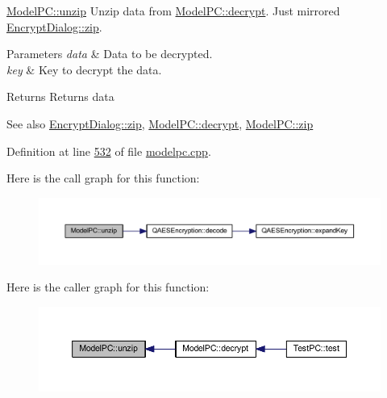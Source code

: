 \mbox{\hyperlink{class_model_p_c_a6da88f166785a49f73b22c169f956fd0}{Model\+P\+C\+::unzip}} Unzip data from \mbox{\hyperlink{class_model_p_c_af1f0b21565bf39808c4cdd448fad0ea8}{Model\+P\+C\+::decrypt}}. Just mirrored \mbox{\hyperlink{class_encrypt_dialog_a2bff820a3df4ddc36ecb07ed74b7138a}{Encrypt\+Dialog\+::zip}}. 


\begin{DoxyParams}{Parameters}
{\em data} & Data to be decrypted. \\
\hline
{\em key} & Key to decrypt the data. \\
\hline
\end{DoxyParams}
\begin{DoxyReturn}{Returns}
Returns data 
\end{DoxyReturn}
\begin{DoxySeeAlso}{See also}
\mbox{\hyperlink{class_encrypt_dialog_a2bff820a3df4ddc36ecb07ed74b7138a}{Encrypt\+Dialog\+::zip}}, \mbox{\hyperlink{class_model_p_c_af1f0b21565bf39808c4cdd448fad0ea8}{Model\+P\+C\+::decrypt}}, \mbox{\hyperlink{class_model_p_c_afebbbfa4b07deba4f68fc6dfb50f353f}{Model\+P\+C\+::zip}} 
\end{DoxySeeAlso}


Definition at line \mbox{\hyperlink{modelpc_8cpp_source_l00532}{532}} of file \mbox{\hyperlink{modelpc_8cpp_source}{modelpc.\+cpp}}.

Here is the call graph for this function\+:
\nopagebreak
\begin{figure}[H]
\begin{center}
\leavevmode
\includegraphics[width=350pt]{class_model_p_c_a6da88f166785a49f73b22c169f956fd0_cgraph}
\end{center}
\end{figure}
Here is the caller graph for this function\+:
\nopagebreak
\begin{figure}[H]
\begin{center}
\leavevmode
\includegraphics[width=350pt]{class_model_p_c_a6da88f166785a49f73b22c169f956fd0_icgraph}
\end{center}
\end{figure}
\mbox{\label{class_model_p_c_afebbbfa4b07deba4f68fc6dfb50f353f}} 
